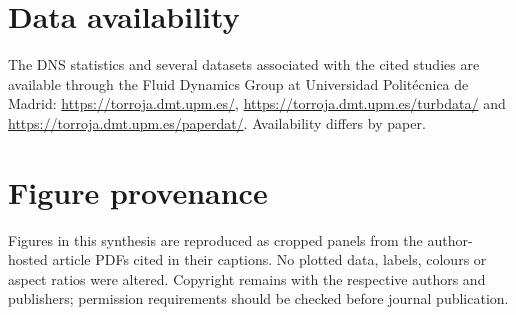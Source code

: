 \documentclass[11pt]{article}
\begin{document}
\section*{Data availability}
The DNS statistics and several datasets associated with the cited studies are available through the Fluid Dynamics Group at Universidad Polit\'ecnica de Madrid: \url{https://torroja.dmt.upm.es/}, \url{https://torroja.dmt.upm.es/turbdata/} and \url{https://torroja.dmt.upm.es/paperdat/}. Availability differs by paper.

\section*{Figure provenance}
Figures in this synthesis are reproduced as cropped panels from the author-hosted article PDFs cited in their captions. No plotted data, labels, colours or aspect ratios were altered. Copyright remains with the respective authors and publishers; permission requirements should be checked before journal publication.



\end{document}
